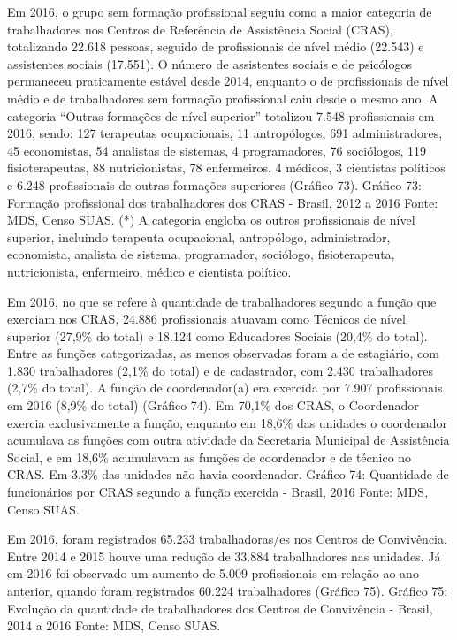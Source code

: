 \documentclass[
  brazilian]{report}
\begin{document}
Em 2016, o grupo sem formação profissional seguiu como a maior categoria
de trabalhadores nos Centros de Referência de Assistência Social (CRAS),
totalizando 22.618 pessoas, seguido de profissionais de nível médio
(22.543) e assistentes sociais (17.551). O número de assistentes sociais
e de psicólogos permaneceu praticamente estável desde 2014, enquanto o
de profissionais de nível médio e de trabalhadores sem formação
profissional caiu desde o mesmo ano. A categoria ``Outras formações de
nível superior'' totalizou 7.548 profissionais em 2016, sendo: 127
terapeutas ocupacionais, 11 antropólogos, 691 administradores, 45
economistas, 54 analistas de sistemas, 4 programadores, 76 sociólogos,
119 fisioterapeutas, 88 nutricionistas, 78 enfermeiros, 4 médicos, 3
cientistas políticos e 6.248 profissionais de outras formações
superiores (Gráfico 73). Gráfico 73: Formação profissional dos
trabalhadores dos CRAS - Brasil, 2012 a 2016 Fonte: MDS, Censo SUAS. (*)
A categoria engloba os outros profissionais de nível superior, incluindo
terapeuta ocupacional, antropólogo, administrador, economista, analista
de sistema, programador, sociólogo, fisioterapeuta, nutricionista,
enfermeiro, médico e cientista político.

Em 2016, no que se refere à quantidade de trabalhadores segundo a função
que exerciam nos CRAS, 24.886 profissionais atuavam como Técnicos de
nível superior (27,9\% do total) e 18.124 como Educadores Sociais
(20,4\% do total). Entre as funções categorizadas, as menos observadas
foram a de estagiário, com 1.830 trabalhadores (2,1\% do total) e de
cadastrador, com 2.430 trabalhadores (2,7\% do total). A função de
coordenador(a) era exercida por 7.907 profissionais em 2016 (8,9\% do
total) (Gráfico 74). Em 70,1\% dos CRAS, o Coordenador exercia
exclusivamente a função, enquanto em 18,6\% das unidades o coordenador
acumulava as funções com outra atividade da Secretaria Municipal de
Assistência Social, e em 18,6\% acumulavam as funções de coordenador e
de técnico no CRAS. Em 3,3\% das unidades não havia coordenador. Gráfico
74: Quantidade de funcionários por CRAS segundo a função exercida -
Brasil, 2016 Fonte: MDS, Censo SUAS.

Em 2016, foram registrados 65.233 trabalhadoras/es nos Centros de
Convivência. Entre 2014 e 2015 houve uma redução de 33.884 trabalhadores
nas unidades. Já em 2016 foi observado um aumento de 5.009 profissionais
em relação ao ano anterior, quando foram registrados 60.224
trabalhadores (Gráfico 75). Gráfico 75: Evolução da quantidade de
trabalhadores dos Centros de Convivência - Brasil, 2014 a 2016 Fonte:
MDS, Censo SUAS.
\end{document}
